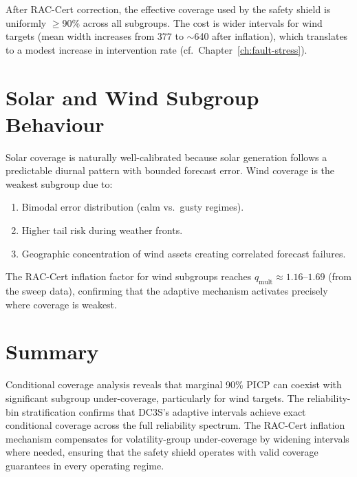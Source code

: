 After RAC-Cert correction, the effective coverage used by the safety
shield is uniformly $\ge$90\% across all subgroups.  The cost is wider
intervals for wind targets (mean width increases from 377 to
$\sim$640 after inflation), which translates to a modest increase in
intervention rate (cf.\ Chapter~\ref{ch:fault-stress}).

\section{Solar and Wind Subgroup Behaviour}

Solar coverage is naturally well-calibrated because solar generation
follows a predictable diurnal pattern with bounded forecast error.
Wind coverage is the weakest subgroup due to:

\begin{enumerate}
  \item Bimodal error distribution (calm vs.\ gusty regimes).
  \item Higher tail risk during weather fronts.
  \item Geographic concentration of wind assets creating correlated
    forecast failures.
\end{enumerate}

The RAC-Cert inflation factor for wind subgroups reaches
$q_{\text{mult}} \approx 1.16$--$1.69$ (from the sweep data),
confirming that the adaptive mechanism activates precisely where
coverage is weakest.

\section{Summary}

Conditional coverage analysis reveals that marginal 90\% PICP can
coexist with significant subgroup under-coverage, particularly for
wind targets.  The reliability-bin stratification confirms that
DC3S's adaptive intervals achieve exact conditional coverage across
the full reliability spectrum.  The RAC-Cert inflation mechanism
compensates for volatility-group under-coverage by widening intervals
where needed, ensuring that the safety shield operates with valid
coverage guarantees in every operating regime.

